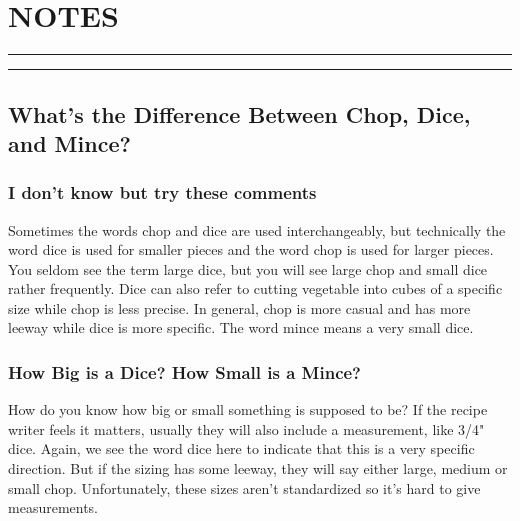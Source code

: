 \documentclass[
]{book}
\begin{document}
\hypertarget{notes}{%
\chapter*{NOTES}\label{notes}}


\begin{center}\rule{0.5\linewidth}{0.5pt}\end{center}

\begin{center}\rule{0.5\linewidth}{0.5pt}\end{center}

\hypertarget{whats-the-difference-between-chop-dice-and-mince}{%
\section*{What's the Difference Between Chop, Dice, and Mince?}\label{whats-the-difference-between-chop-dice-and-mince}}


\hypertarget{i-dont-know-but-try-these-comments}{%
\subsection*{I don't know but try these comments}\label{i-dont-know-but-try-these-comments}}


Sometimes the words chop and dice are used interchangeably, but technically the word dice is used for smaller pieces and the word chop is used for larger pieces. You seldom see the term large dice, but you will see large chop and small dice rather frequently. Dice can also refer to cutting vegetable into cubes of a specific size while chop is less precise. In general, chop is more casual and has more leeway while dice is more specific. The word mince means a very small dice.

\hypertarget{how-big-is-a-dice-how-small-is-a-mince}{%
\subsection*{How Big is a Dice? How Small is a Mince?}\label{how-big-is-a-dice-how-small-is-a-mince}}


How do you know how big or small something is supposed to be? If the recipe writer feels it matters, usually they will also include a measurement, like 3/4" dice. Again, we see the word dice here to indicate that this is a very specific direction. But if the sizing has some leeway, they will say either large, medium or small chop. Unfortunately, these sizes aren't standardized so it's hard to give measurements.
\end{document}
